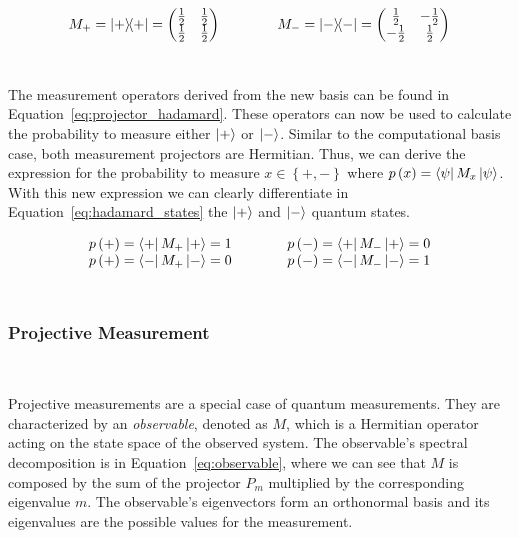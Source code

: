 \begin{equation}\label{eq:projector_hadamard}
  M_+ = \ketbra{+}{+} = \begin{pmatrix}
                          \frac{1}{2} & \frac{1}{2} \\
                          \frac{1}{2} & \frac{1}{2}
                        \end{pmatrix} \qquad \qquad
  M_- = \ketbra{-}{-} = \begin{pmatrix}
                          \frac{1}{2} & -\frac{1}{2} \\
                          -\frac{1}{2} & \frac{1}{2}
                        \end{pmatrix}
\end{equation} \

The measurement operators derived from the new basis can be found
in Equation~\ref{eq:projector_hadamard}. These operators can now
be used to calculate the probability to measure either \(\ket{+}\)
or \(\ket{-}\). Similar to the computational basis case, both
measurement projectors are Hermitian. Thus, we can derive the
expression for the probability to measure \(x \in \left\{+,-\right\}\)
where \(p\left(x\right) = \bra{\psi}M_x\ket{\psi}\). With this new
expression we can clearly differentiate in Equation~\ref{eq:hadamard_states}
the \(\ket{+}\) and \(\ket{-}\) quantum states. \

\begin{equation}\label{eq:hadamard_states}
  \begin{matrix}
    p\left(+\right) = \bra{+}M_+\ket{+} = 1 \\
    p\left(+\right) = \bra{-}M_+\ket{-} = 0
  \end{matrix} \qquad \qquad
  \begin{matrix}
    p\left(-\right) = \bra{+}M_-\ket{+} = 0\\
    p\left(-\right) = \bra{-}M_-\ket{-} = 1
  \end{matrix}
\end{equation} \

\subsubsection{Projective Measurement} \

Projective measurements are a special case of quantum measurements.
They are characterized by an \textit{observable}, denoted as \(M\),
which is a Hermitian operator acting on the state space of the observed system.
The observable's spectral decomposition is in Equation~\ref{eq:observable},
where we can see that \(M\) is composed by the sum of the projector \(P_m\)
multiplied by the corresponding eigenvalue \(m\). The observable's
eigenvectors form an orthonormal basis and its
eigenvalues are the possible values for the measurement. \

